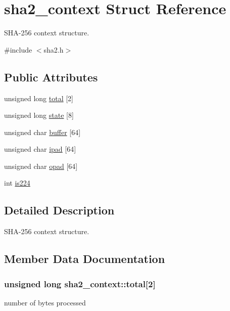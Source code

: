 \hypertarget{structsha2__context}{}\section{sha2\+\_\+context Struct Reference}
\label{structsha2__context}


S\+H\+A-\/256 context structure.  




{\ttfamily \#include $<$sha2.\+h$>$}

\subsection*{Public Attributes}
\begin{DoxyCompactItemize}
\item 
unsigned long \hyperlink{structsha2__context_a485843c955ab26a3d78d499934371df1}{total} \mbox{[}2\mbox{]}
\item 
unsigned long \hyperlink{structsha2__context_a61a62a66ac1851bcd90aa65e7fad1328}{state} \mbox{[}8\mbox{]}
\item 
unsigned char \hyperlink{structsha2__context_aa5c93c2e2e8fc23008a849ea4f9a0b91}{buffer} \mbox{[}64\mbox{]}
\item 
unsigned char \hyperlink{structsha2__context_a4b003f9de8a8d823d19e813311764bd2}{ipad} \mbox{[}64\mbox{]}
\item 
unsigned char \hyperlink{structsha2__context_a3f710fbbb4c2c1ce3d57de40b1036cea}{opad} \mbox{[}64\mbox{]}
\item 
int \hyperlink{structsha2__context_a20fd61f8c14d811e93b7186ca71ecfbd}{is224}
\end{DoxyCompactItemize}


\subsection{Detailed Description}
S\+H\+A-\/256 context structure. 

\subsection{Member Data Documentation}
\subsubsection[{\texorpdfstring{total}{total}}]{\setlength{\rightskip}{0pt plus 5cm}unsigned long sha2\+\_\+context\+::total\mbox{[}2\mbox{]}}\hypertarget{structsha2__context_a485843c955ab26a3d78d499934371df1}{}\label{structsha2__context_a485843c955ab26a3d78d499934371df1}
number of bytes processed 
